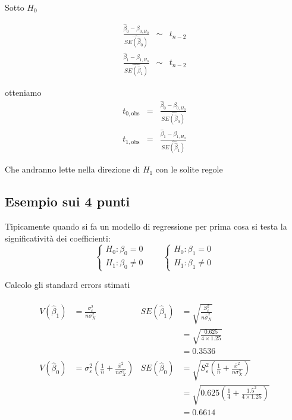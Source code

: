 \documentclass[
  11pt,
]{book}
\theoremstyle{mytheoremstyle}
\theoremstyle{mydefstyle}
\begin{document}
\begin{info}
Sotto \(H_0\)

\begin{eqnarray*}
 \frac{\hat\beta_0-\beta_{0,H_0}}{\widehat{SE(\hat\beta_0)}} &\sim& t_{n-2} \\
 \frac{\hat\beta_1-\beta_{1,H_0}}{\widehat{SE(\hat\beta_1)}} &\sim& t_{n-2}
\end{eqnarray*}

otteniamo
\begin{eqnarray*}
t_{0,\text{obs}} &=& \frac{\hat\beta_0-\beta_{0,H_0}}{\widehat{SE(\hat\beta_0)}} \\
t_{1,\text{obs}} &=& \frac{\hat\beta_1-\beta_{1,H_0}}{\widehat{SE(\hat\beta_1)}}
\end{eqnarray*}

Che andranno lette nella direzione di \(H_1\) con le solite regole

\end{info}

\subsection{Esempio sui 4 punti}\label{esempio-sui-4-punti}

Tipicamente quando si fa un modello di regressione per prima cosa si testa la significatività dei
coefficienti:
\[
\begin{cases}
H_0:\beta_0=0\\H_1:\beta_0\neq 0
\end{cases}
\qquad
\begin{cases}
H_0:\beta_1=0\\H_1:\beta_1\neq 0
\end{cases}
\]

Calcolo gli standard errors stimati

\[\begin{aligned}
V(\hat\beta_1)&=\frac{\sigma_\varepsilon^2}{n\sigma_X^2} &\widehat {SE(\hat\beta_1)}&=\sqrt{\frac{S_\varepsilon^2}{n\hat\sigma_X^2}}\\
              &                                          &&=\sqrt{\frac{0.625}{4\times1.25}}\\
              &&&=0.3536\\
V(\hat\beta_0)&=\sigma_\varepsilon^2\left(\frac 1 n +\frac{\bar x^2}{n\sigma_X^2}\right) 
&\widehat {SE(\hat\beta_0)} &= \sqrt{S_\varepsilon^2\left(\frac 1 n +\frac{\bar x^2}{n\sigma_X^2}\right)}\\
                &&           &= \sqrt{0.625\left(\frac 1 {4} +\frac{1.5^2}{4\times 1.25}\right)}\\
                  &&         &= 0.6614
\end{aligned}\]
\end{document}
